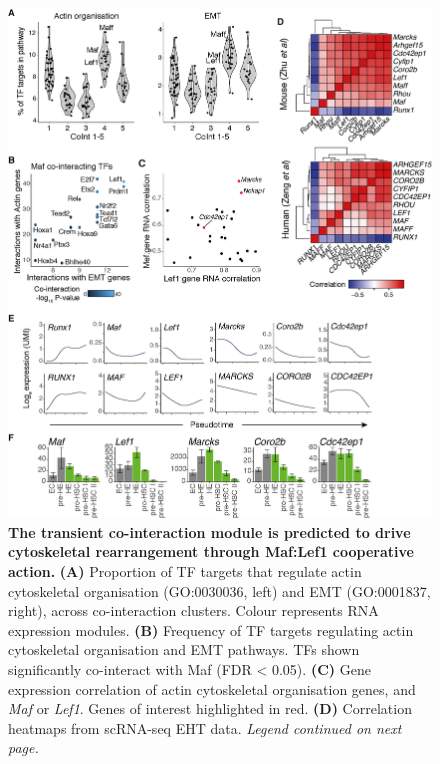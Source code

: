 \begin{figure}[htbp]
    \centering
    \includegraphics[width=\textwidth,height=\textheight,keepaspectratio]{figures/chapter3/ch3_maf-lef1.png}
    \caption[{The transient co-interaction module is predicted to drive cytoskeletal rearrangement through Maf:Lef1 cooperative action.}]
    {\textbf{The transient co-interaction module is predicted to drive cytoskeletal rearrangement through Maf:Lef1 cooperative action.} 
    \textbf{(A)} Proportion of TF targets that regulate actin cytoskeletal organisation (GO:0030036, left) and EMT (GO:0001837, right), across co-interaction clusters. Colour represents RNA expression modules. 
    \textbf{(B)} Frequency of TF targets regulating actin cytoskeletal organisation and EMT pathways. TFs shown significantly co-interact with Maf (FDR < 0.05). 
    \textbf{(C)} Gene expression correlation of actin cytoskeletal organisation genes, and \textit{Maf} or \textit{Lef1}. Genes of interest highlighted in red. 
    \textbf{(D)} Correlation heatmaps from scRNA-seq EHT data. 
    \textit{Legend continued on next page.}
    }
    \label{fig:ch3_maf1-lef1}
\end{figure}

